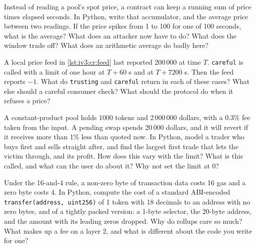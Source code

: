 \begin{question}\label{iq:iv3:smart-contracts-and-crypto-engineering:16}
Instead of reading a pool's spot price, a contract can keep a running sum of price times elapsed seconds. In Python, write that accumulator, and the average price between two readings. If the price spikes from 1 to 100 for one of 100 seconds, what is the average? What does an attacker now have to do? What does the window trade off? What does an arithmetic average do badly here?
\end{question}

\begin{question}\label{iq:iv3:smart-contracts-and-crypto-engineering:17}
A local price feed in \cref{lst:iv3:cr:feed} last reported 200\,000 at time $T$. \texttt{careful} is called with a limit of one hour at $T + 60$ s and at $T + 7200$ s. Then the feed reports $-1$. What do \texttt{trusting} and \texttt{careful} return in each of these cases? What else should a careful consumer check? What should the protocol do when it refuses a price?
\label{lst:iv3:cr:feed}
\end{question}

\begin{question}\label{iq:iv3:smart-contracts-and-crypto-engineering:18}
A constant-product pool holds 1000 tokens and 2\,000\,000 dollars, with a 0.3\% fee taken from the input. A pending swap spends 20\,000 dollars, and it will revert if it receives more than 1\% less than quoted now. In Python, model a trader who buys first and sells straight after, and find the largest first trade that lets the victim through, and its profit. How does this vary with the limit? What is this called, and what can the user do about it? Why not set the limit at 0?
\end{question}

\begin{question}\label{iq:iv3:smart-contracts-and-crypto-engineering:19}
Under the 16-and-4 rule, a non-zero byte of transaction data costs 16 gas and a zero byte costs 4. In Python, compute the cost of a standard ABI-encoded \texttt{transfer(address, uint256)} of 1 token with 18 decimals to an address with no zero bytes, and of a tightly packed version: a 1-byte selector, the 20-byte address, and the amount with its leading zeros dropped. Why do rollups care so much? What makes up a fee on a layer 2, and what is different about the code you write for one?
\end{question}


